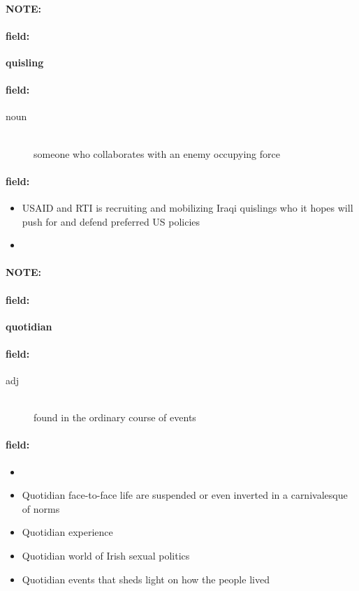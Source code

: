 \documentclass[12pt]{article}
\newenvironment{note}{\paragraph{NOTE:}}{}
\newenvironment{field}{\paragraph{field:}}{}
\begin{document}
\begin{note}
\begin{field}
\textbf{\large quisling}
\end{field}


\begin{field}
\begin{description}
\item[noun] \hfill \\ 
someone who collaborates with an enemy occupying force

\end{description}
\end{field}

\begin{field}
\begin{itemize}
\item USAID and RTI is recruiting and mobilizing Iraqi quislings who it hopes will push for and defend preferred US policies
\item 
\end{itemize}
\end{field}
\end{note}
\begin{note}
\begin{field}
\textbf{\large quotidian}
\end{field}


\begin{field}
\begin{description}
\item[adj] \hfill \\ 
found in the ordinary course of events

\end{description}
\end{field}

\begin{field}
\begin{itemize}
\item 
\item Quotidian face-to-face life are suspended or even inverted in a carnivalesque of norms
\item Quotidian experience
\item Quotidian world of Irish sexual politics
\item Quotidian events that sheds light on how the people lived
\end{itemize}
\end{field}
\end{note}
\end{document}

